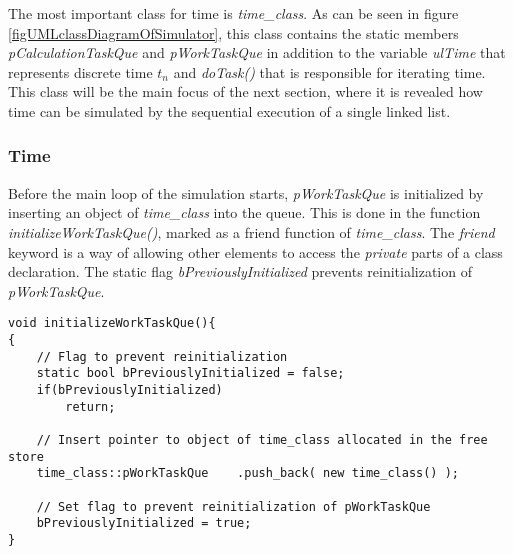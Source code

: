 			The most important class for time is \emph{time\_class}.
			As can be seen in figure \ref{figUMLclassDiagramOfSimulator}, this class contains the static members \emph{pCalculationTaskQue} and \emph{pWorkTaskQue} in addition 
				to the variable \emph{ulTime} that represents discrete time $t_n$ and \emph{doTask()} that is responsible for iterating time.
			This class will be the main focus of the next section, where it is revealed how time can be simulated by the sequential execution of a single linked list.


		\subsubsection{Time}
		\label{ssecTime}
			Before the main loop of the simulation starts, \emph{pWorkTaskQue} is initialized by inserting an object of \emph{time\_class} into the queue. %
			This is done in the function \emph{initializeWorkTaskQue()}, marked as a friend function of \emph{time\_class}.
			The \emph{friend} keyword is a way of allowing other elements to access the \emph{private} parts of a class declaration\cite{Stroustrup2000KAP11}. 
			The static flag \emph{bPreviouslyInitialized} prevents reinitialization of \emph{pWorkTaskQue}. %
\begin{lstlisting}
void initializeWorkTaskQue(){
{
	// Flag to prevent reinitialization
	static bool bPreviouslyInitialized = false;
	if(bPreviouslyInitialized)
		return;

	// Insert pointer to object of time_class allocated in the free store	 
 	time_class::pWorkTaskQue 	.push_back( new time_class() );

	// Set flag to prevent reinitialization of pWorkTaskQue
	bPreviouslyInitialized = true;
}
\end{lstlisting}
			
